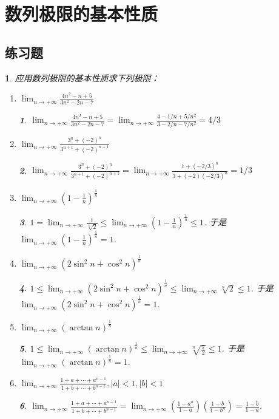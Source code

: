 \documentclass[utf8]{book}
\newtheorem{example}{}[section]             %
\newtheorem{solution}{}
\begin{document}
\section{数列极限的基本性质}
\subsection{练习题}
\begin{example}应用数列极限的基本性质求下列极限：
\begingroup
\renewcommand\labelenumi{\normalfont(\theenumi)}
\begin{enumerate}
\item $\displaystyle \lim_{n\to +\infty}\frac{4n^2-n +5}{3n^2 -2n -7}$
\begin{solution}
$\displaystyle \lim_{n\to +\infty}\frac{4n^2-n +5}{3n^2 -2n -7}=\lim_{n\to +\infty}\frac{4-1/n +5/n^2}{3-2/n -7/n^2} = 4/3$
\end{solution}
\item $\displaystyle \lim_{n\to +\infty}\frac{3^n+(-2)^n}{3^{n+1} +(-2)^{n+1}}$
\begin{solution}
$\displaystyle \lim_{n\to +\infty}\frac{3^n+(-2)^n}{3^{n+1} +(-2)^{n+1}}=\lim_{n\to +\infty}\frac{1+(-2/3)^n}{3+(-2)(-2/3)^n} = 1/3$
\end{solution}
\item $\displaystyle \lim_{n\to +\infty}\left(1-\frac{1}{n}\right)^{\frac{1}{n}}$
\begin{solution}
$1 = \displaystyle \lim_{n\to +\infty}\frac{1}{\sqrt[n]2} \leq \lim_{n\to +\infty}\left(1-\frac{1}{n}\right)^{\frac{1}{n}} \leq 1$. 于是 $\displaystyle \lim_{n\to +\infty}\left(1-\frac{1}{n}\right)^{\frac{1}{n}} = 1$.
\end{solution}
\item $\displaystyle \lim_{n\to +\infty}(2\sin^2n+\cos^2n)^{\frac{1}{n}}$
\begin{solution}
$1 \leq \displaystyle \lim_{n\to +\infty}(2\sin^2n+\cos^2n)^{\frac{1}{n}}\leq \lim_{n\to +\infty}\sqrt[n]2 \leq 1$. 
于是 $\displaystyle \lim_{n\to +\infty}(2\sin^2n+\cos^2n)^{\frac{1}{n}} = 1$.
\end{solution}
\item $\displaystyle \lim_{n\to +\infty}(\arctan n)^{\frac{1}{n}}$
\begin{solution}
$1 \leq \displaystyle \lim_{n\to +\infty}(\arctan n)^{\frac{1}{n}}\leq \lim_{n\to +\infty}\sqrt[n]{\frac{\pi}{2}} \leq 1$. 
于是 $\displaystyle \lim_{n\to +\infty}(\arctan n)^{\frac{1}{n}} = 1$.
\end{solution}
\item $\displaystyle \lim_{n\to +\infty}\frac{1+a+\cdots+a^{n-1}}{1+b+\cdots +b^{n-1}}, |a| < 1, |b| < 1$
\begin{solution}
$\displaystyle \lim_{n\to +\infty}\frac{1+a+\cdots+a^{n-1}}{1+b+\cdots +b^{n-1}} = 
\lim_{n\to +\infty}\left(\frac{1-a^n}{1-a}\right)\left(\frac{1-b}{1-b^n}\right) = \frac{1-b}{1-a}$. 
\end{solution}


\end{enumerate}
\end{example}
\end{document}
